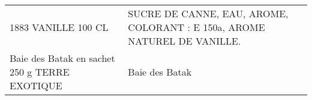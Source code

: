 \begin{longtable}{p{5cm}p{10cm}}
                                                                                      1883 VANILLE 100 CL &                                                                                                                                                                                                                                                                                                                                                                                                                                                                                                                                                                                                                                                                                                                                                                                                                                                                                                                                                                 SUCRE DE CANNE, EAU, AROME, COLORANT : E 150a, AROME NATUREL DE VANILLE. \\
                                                            Baie des Batak en sachet 250 g TERRE EXOTIQUE &                                                                                                                                                                                                                                                                                                                                                                                                                                                                                                                                                                                                                                                                                                                                                                                                                                                                                                                                                                                                                           Baie des Batak \\

\end{longtable}
